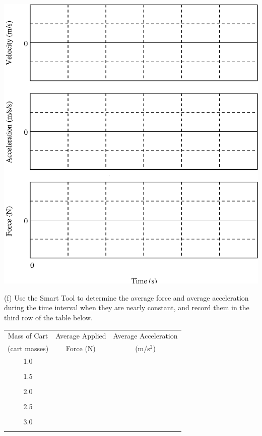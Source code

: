 \vspace{0.3cm}
{\par\centering \includegraphics{force2/force2_fig4.eps} \par}
\vspace{0.3cm}

(f) Use the Smart Tool to determine the average force and average acceleration
during the time interval when they are nearly constant, and record them in the
third row of the table below.

\vspace{0.3cm}
{\centering \begin{tabular}{|c|c|c|}
\hline 
Mass of Cart&
Average Applied&
Average Acceleration\\
(cart masses)&
Force (N)&
(m/s\( ^{2} \))\\
\hline 
\hline 
1.0&
&
\\
&
&
\\
\hline 
1.5&
&
\\
&
&
\\
\hline 
2.0&
&
\\
&
&
\\
\hline 
2.5&
&
\\
&
&
\\
\hline 
3.0&
&
\\
&
&
\\
\hline 
\end{tabular}\par}
\vspace{0.3cm}

